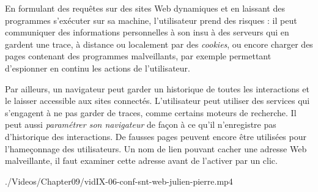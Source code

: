 \begin{tcolorbox}[title={Sécurité et confidentialité}, toprule=0pt, leftrule=0pt, rightrule=0pt, arc=0pt,
                  fonttitle=\scshape\boxtitlefont,
                  colbacktitle=white, coltitle=firstcolor, colframe=firstcolor, colback=firstcolor!10,
                  breakable, enhanced jigsaw]
En formulant des requêtes sur des sites Web dynamiques et en laissant des programmes s’exécuter sur sa machine, l’utilisateur prend des risques : il peut communiquer des informations personnelles à son insu à des serveurs qui en gardent une trace, à distance ou localement par des \textit{cookies}, ou encore charger des pages contenant des programmes malveillants, par exemple permettant d’espionner en continu les actions de l’utilisateur. 

Par ailleurs, un navigateur peut garder un historique de toutes les interactions et le laisser accessible aux sites connectés. L’utilisateur peut utiliser des services qui s’engagent à ne pas garder de traces, comme certains moteurs de recherche. Il peut aussi \emph{paramétrer son navigateur} de façon à ce qu'il n’enregistre pas d’historique des interactions. De fausses pages peuvent encore être utilisées pour l’hameçonnage des utilisateurs. Un nom de lien pouvant cacher une adresse Web malveillante, il faut examiner cette adresse avant de l’activer par un clic.
\end{tcolorbox}


\begin{marginvideo}
		{./Videos/Chapter09/vidIX-06-conf-snt-web-julien-pierre.mp4}%
\end{marginvideo}

